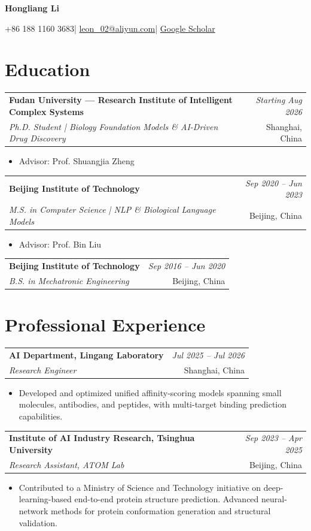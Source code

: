 \documentclass[10pt,a4paper]{article}
\makeatletter
\newcommand{\CVName}{Hongliang Li}
\newcommand{\CVPhone}{+86 188 1160 3683}
\newcommand{\CVEmail}{leon\_02@aliyun.com}
\newcommand{\CVScholarURL}{https://scholar.google.com/citations?user=Fk49kawAAAAJ\&hl=en\&oi=sra}
\newcommand{\entry}[4]{%
  \noindent\begin{tabularx}{\linewidth}{@{}>{\raggedright\arraybackslash}Xr@{}}
    \textbullet\enspace\textbf{#1} & \textit{#2} \\
    \hspace{1.05em}\textit{#3} & #4
  \end{tabularx}\par\vspace{0.12em}
}
\newenvironment{detailitems}{%
  \begin{itemize}[leftmargin=2.15em,label=$\circ$,itemsep=0.20em,topsep=0.16em,parsep=0pt,partopsep=0pt]
}{\end{itemize}}
\makeatother
\begin{document}
\fontsize{10.3}{12.7}\selectfont

\begin{center}
  {\fontsize{25.5}{28}\selectfont\bfseries \CVName}\par
  \vspace{0.26em}
  \CVPhone\enspace |\enspace
  \href{mailto:leon_02@aliyun.com}{\CVEmail}\enspace |\enspace
  \href{\CVScholarURL}{Google Scholar}
\end{center}
\vspace{-0.35em}

\section{Education}
\entry{Fudan University — Research Institute of Intelligent Complex Systems}{Starting Aug 2026}{Ph.D. Student | Biology Foundation Models \& AI-Driven Drug Discovery}{Shanghai, China}
\begin{detailitems}
  \item Advisor: Prof. Shuangjia Zheng
\end{detailitems}

\entry{Beijing Institute of Technology}{Sep 2020 -- Jun 2023}{M.S. in Computer Science | NLP \& Biological Language Models}{Beijing, China}
\begin{detailitems}
  \item Advisor: Prof. Bin Liu
\end{detailitems}

\entry{Beijing Institute of Technology}{Sep 2016 -- Jun 2020}{B.S. in Mechatronic Engineering}{Beijing, China}

\section{Professional Experience}
\entry{AI Department, Lingang Laboratory}{Jul 2025 -- Jul 2026}{Research Engineer}{Shanghai, China}
\begin{detailitems}
  \item Developed and optimized unified affinity-scoring models spanning small molecules, antibodies, and peptides, with multi-target binding prediction capabilities.
\end{detailitems}

\entry{Institute of AI Industry Research, Tsinghua University}{Sep 2023 -- Apr 2025}{Research Assistant, ATOM Lab}{Beijing, China}
\begin{detailitems}
  \item Contributed to a Ministry of Science and Technology initiative on deep-learning-based end-to-end protein structure prediction. Advanced neural-network methods for protein conformation generation and structural validation.
\end{detailitems}
\end{document}
